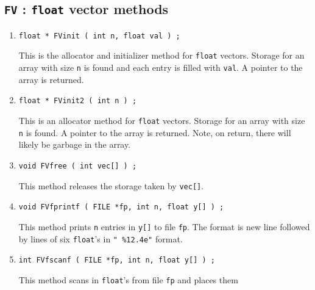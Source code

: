 \par
\subsection{{\tt FV} : {\tt float} vector methods}
\label{subsection:Utilities:proto:FV}
\par
\begin{enumerate}
\item
\begin{verbatim}
float * FVinit ( int n, float val ) ;
\end{verbatim}
This is the allocator and initializer method for {\tt float} vectors.
Storage for an array with size {\tt n} is found and each
entry is filled with {\tt val}.
A pointer to the array is returned.
\item
\begin{verbatim}
float * FVinit2 ( int n ) ;
\end{verbatim}
This is an allocator method for {\tt float} vectors.
Storage for an array with size {\tt n} is found.
A pointer to the array is returned.
Note, on return, there will likely be garbage in the array.
\item
\begin{verbatim}
void FVfree ( int vec[] ) ;
\end{verbatim}
This method releases the storage taken by {\tt vec[]}.
\item
\begin{verbatim}
void FVfprintf ( FILE *fp, int n, float y[] ) ;
\end{verbatim}
This method prints {\tt n} entries in {\tt y[]} to file {\tt fp}.
The format is new line followed by lines of six {\tt float}'s in
{\tt " \%12.4e"} format.
\item
\begin{verbatim}
int FVfscanf ( FILE *fp, int n, float y[] ) ;
\end{verbatim}
This method scans in {\tt float}'s from file {\tt fp} and places them

\end{enumerate}
